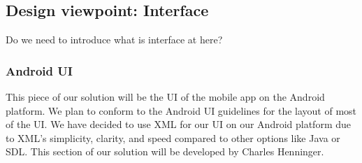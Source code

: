 \documentclass[letterpaper, 10pt,titlepage]{article}
\begin{document}
\subsection{Design viewpoint: Interface}
Do we need to introduce what is interface at here?

\subsubsection{Android UI}
This piece of our solution will be the UI of the mobile app on the Android platform. We plan to conform to the Android UI guidelines for the layout of most of the UI. We have decided to use XML for our UI on our Android platform due to XML’s  simplicity, clarity, and speed compared to other options like Java or SDL. This section of our solution will be developed by Charles Henninger.
\end{document}
